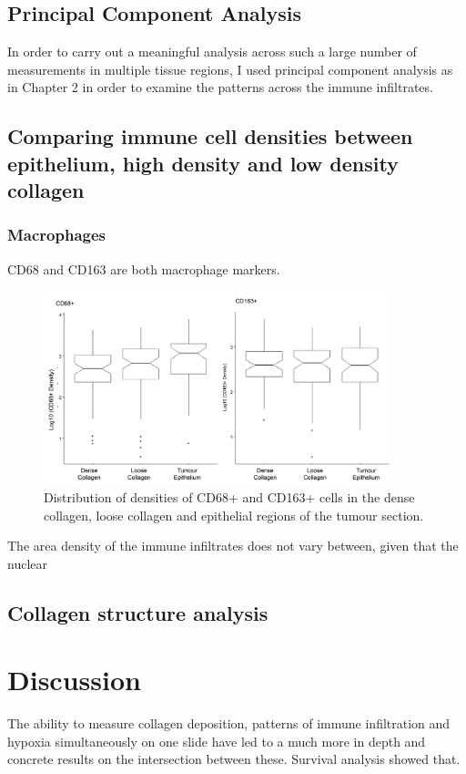 \subsection{Principal Component Analysis}
In order to carry out a meaningful analysis across such a large number of measurements in multiple tissue regions, I used principal component analysis as in Chapter 2 in order to examine the patterns across the immune infiltrates. 

\subsection{Comparing immune cell densities between epithelium, high density and low density collagen}

\subsubsection{Macrophages}

CD68 and CD163 are both macrophage markers. 

\begin{figure}
    \centering
    \includegraphics[width=0.9\textwidth]{Chapter4/figs/Thesis-10.png}
    \caption{Distribution of densities of CD68+ and CD163+ cells in the dense collagen, loose collagen and epithelial regions of the tumour section.}
    \label{fig:distribution}
\end{figure}

The area density of the immune infiltrates does not vary between, given that the nuclear 

\subsection{Collagen structure analysis}

\section{Discussion}
The ability to measure collagen deposition, patterns of immune infiltration and hypoxia simultaneously on one slide have led to a much more in depth and concrete results on the intersection between these.
Survival analysis showed that. 

